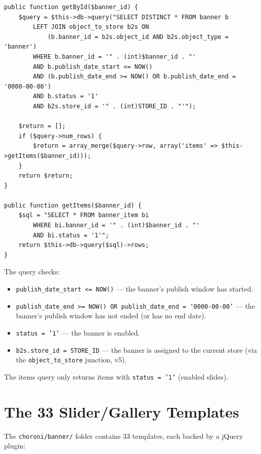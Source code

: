 \documentclass[11pt,a4paper]{article}
\begin{document}
\begin{lstlisting}[caption={Storefront \texttt{ModelContentBanner::getById()} --- store-scoped with publish window.},label={lst:storefront-banner-model}]
public function getById($banner_id) {
    $query = $this->db->query("SELECT DISTINCT * FROM banner b
        LEFT JOIN object_to_store b2s ON
            (b.banner_id = b2s.object_id AND b2s.object_type = 'banner')
        WHERE b.banner_id = '" . (int)$banner_id . "'
        AND b.publish_date_start <= NOW()
        AND (b.publish_date_end >= NOW() OR b.publish_date_end = '0000-00-00')
        AND b.status = '1'
        AND b2s.store_id = '" . (int)STORE_ID . "'");

    $return = [];
    if ($query->num_rows) {
        $return = array_merge($query->row, array('items' => $this->getItems($banner_id)));
    }
    return $return;
}

public function getItems($banner_id) {
    $sql = "SELECT * FROM banner_item bi
        WHERE bi.banner_id = '" . (int)$banner_id . "'
        AND bi.status = '1'";
    return $this->db->query($sql)->rows;
}
\end{lstlisting}

The query checks:
\begin{itemize}[leftmargin=1.6em,itemsep=2pt]
  \item \texttt{publish\_date\_start <= NOW()} --- the banner's
        publish window has started.
  \item \texttt{publish\_date\_end >= NOW() OR publish\_date\_end =
        '0000-00-00'} --- the banner's publish window has not ended
        (or has no end date).
  \item \texttt{status = '1'} --- the banner is enabled.
  \item \texttt{b2s.store\_id = STORE\_ID} --- the banner is assigned
        to the current store (via the \texttt{object\_to\_store}
        junction, v5).
\end{itemize}

The items query only returns items with \texttt{status = '1'}
(enabled slides).

\section{The 33 Slider/Gallery Templates}\label{sec:templates}

The \texttt{choroni/banner/} folder contains 33 templates, each backed
by a jQuery plugin:
\end{document}
